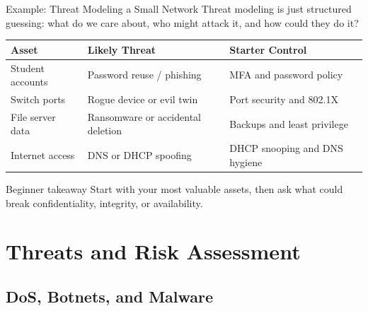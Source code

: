 \documentclass[aspectratio=169]{beamer}  %
\begin{document}
\begin{frame}{Example: Threat Modeling a Small Network}
    \footnotesize
    Threat modeling is just structured guessing: what do we care about, who might attack it, and how could they do it?

    \vspace{0.4em}
    \begin{table}[]
        \renewcommand{\arraystretch}{1.2}
        \centering
        \begin{tabular}{|l|l|l|}
        \hline
        \rowcolor[HTML]{EFEFEF} \textbf{Asset} & \textbf{Likely Threat} & \textbf{Starter Control} \\ \hline
        Student accounts & Password reuse / phishing & MFA and password policy \\ \hline
        Switch ports & Rogue device or evil twin & Port security and 802.1X \\ \hline
        File server data & Ransomware or accidental deletion & Backups and least privilege \\ \hline
        Internet access & DNS or DHCP spoofing & DHCP snooping and DNS hygiene \\ \hline
        \end{tabular}
    \end{table}

    \begin{exampleblock}{Beginner takeaway}
        \footnotesize
        Start with your most valuable assets, then ask what could break confidentiality, integrity, or availability.
    \end{exampleblock}
\end{frame}

\section{Threats and Risk Assessment}
\subsection{DoS, Botnets, and Malware}

\end{document}
